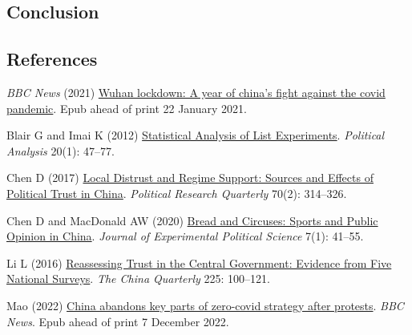\documentclass[
  letterpaper,
  DIV=11,
  numbers=noendperiod]{scrartcl}
\newlength{\cslhangindent}
\newlength{\cslentryspacingunit} %
\newenvironment{CSLReferences}[2] %
 {%
  \setlength{\parindent}{0pt}
  \ifodd #1
  \let\oldpar\par
  \def\par{\hangindent=\cslhangindent\oldpar}
  \fi
  \setlength{\parskip}{#2\cslentryspacingunit}
 }%
 {}
\begin{document}
\begin{table}
\begin{minipage}[t]{\linewidth}
{}

\end{minipage}%

\end{table}

\hypertarget{conclusion}{%
\subsection{Conclusion}\label{conclusion}}

\newpage{}

\hypertarget{references}{%
\subsection{References}\label{references}}

\hypertarget{refs}{}
\begin{CSLReferences}{1}{0}
\leavevmode{}%
\emph{BBC News} (2021)
\href{https://www.bbc.com/news/world-asia-china-55628488}{Wuhan
lockdown: A year of china's fight against the covid pandemic}. Epub
ahead of print 22 January 2021.

\leavevmode{}%
Blair G and Imai K (2012)
\href{https://doi.org/10.1093/pan/mpr048}{Statistical Analysis of List
Experiments}. \emph{Political Analysis} 20(1): 47--77.

\leavevmode{}%
Chen D (2017) \href{https://doi.org/10.1177/1065912917691360}{Local
Distrust and Regime Support: Sources and Effects of Political Trust in
China}. \emph{Political Research Quarterly} 70(2): 314--326.

\leavevmode{}%
Chen D and MacDonald AW (2020)
\href{https://doi.org/10.1017/XPS.2019.15}{Bread and Circuses: Sports
and Public Opinion in China}. \emph{Journal of Experimental Political
Science} 7(1): 41--55.

\leavevmode{}%
Li L (2016) \href{https://doi.org/10.1017/S0305741015001629}{Reassessing
Trust in the Central Government: Evidence from Five National Surveys}.
\emph{The China Quarterly} 225: 100--121.

\leavevmode{}%
Mao (2022)
\href{https://www.bbc.com/news/world-asia-china-63855508}{China abandons
key parts of zero-covid strategy after protests}. \emph{BBC News}. Epub
ahead of print 7 December 2022.


\end{CSLReferences}
\end{document}
